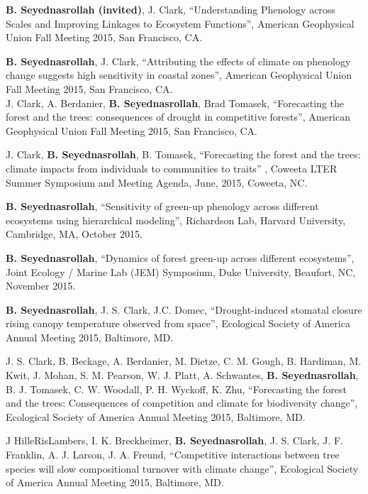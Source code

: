 \documentclass[10pt]{article}
\newenvironment{changemargin}[2]{%
  \begin{list}{}{%
    \setlength{\topsep}{0pt}%
    \setlength{\leftmargin}{#1}%
    \setlength{\rightmargin}{#2}%
    \setlength{\listparindent}{\parindent}%
    \setlength{\itemindent}{\parindent}%
    \setlength{\parsep}{\parskip}%
  }%
  \item[]}{\end{list}
}
\newenvironment{body} {
	\vspace*{-2pt}
	\begin{changemargin}{-0.5in}{-0.5in}
  }
	{\end{changemargin}
}
\begin{document}
\begin{body}
   \textbf{B. Seyednasrollah (invited)}, J. Clark, ``Understanding Phenology across Scales and Improving Linkages to Ecosystem Functions'', American Geophysical Union Fall Meeting 2015, San Francisco, CA.\\
\medskip

   \textbf{B. Seyednasrollah}, J. Clark, ``Attributing the effects of climate on phenology change suggests high sensitivity in coastal zones'', American Geophysical Union Fall Meeting 2015, San Francisco, CA.\\
  \medskip
     J. Clark, A. Berdanier, \textbf{B. Seyednasrollah}, Brad Tomasek, ``Forecasting the forest and the trees: consequences of drought in competitive forests'', American Geophysical Union Fall Meeting 2015, San Francisco, CA.\\
\medskip

   J. Clark, \textbf {B. Seyednasrollah}, B.  Tomasek, ``Forecasting the forest and the trees: climate impacts from individuals to communities to traits'' , Coweeta LTER Summer Symposium and Meeting Agenda, June, 2015, Coweeta, NC.\\
\medskip

   \textbf{B. Seyednasrollah}, ``Sensitivity of green-up phenology across different ecosystems using hierarchical modeling'', Richardson Lab, Harvard University, Cambridge, MA, October 2015.\\
\medskip

   \textbf{B. Seyednasrollah}, ``Dynamics of forest green-up across different ecosystems'', Joint Ecology / Marine Lab (JEM) Symposium, Duke University, Beaufort, NC, November 2015.\\
\medskip

	 \textbf{B. Seyednasrollah}, J. S. Clark, J.C. Domec, ``Drought-induced stomatal closure rising canopy temperature observed from space'', Ecological Society of America Annual Meeting 2015, Baltimore, MD.\\
\medskip

   J. S. Clark, B. Beckage, A. Berdanier, M. Dietze, C. M. Gough, B. Hardiman, M. Kwit, J. Mohan, S. M. Pearson, W. J. Platt, A. Schwantes, \textbf{B. Seyednasrollah}, B. J. Tomasek, C. W. Woodall, P. H. Wyckoff, K. Zhu, ``Forecasting the forest and the trees: Consequences of competition and climate for biodiversity change'', Ecological Society of America Annual Meeting 2015, Baltimore, MD.\\
\medskip

   J HilleRisLambers, I. K. Breckheimer, \textbf{B. Seyednasrollah}, J. S. Clark, J. F. Franklin, A. J. Larson, J. A. Freund, ``Competitive interactions between tree species will slow compositional turnover with climate change'', Ecological Society of America Annual Meeting 2015, Baltimore, MD.\\
\medskip


\end{body}
\end{document}

